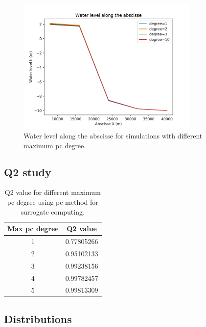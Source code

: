 \documentclass[hidelinks,12pt]{article}
\begin{document}
\begin{figure}
  \centering
  \includegraphics[width=0.8\textwidth]{images/influence_degree_method_surrogate_pc.png}
  \caption{Water level along the abscisse for simulations with different maximum pc degree.}
  	\label{influence_degree_method_surrogate_pc}
\end{figure}

\subsection{Q2 study}

\begin{table}
\begin{tabular}{|c|c|}
  \hline
  Max pc degree & Q2 value \\
  \hline
  1 & 0.77805266\\
  2 & 0.95102133\\
  3 & 0.99238156\\
  4 & 0.99782457\\
  5 & 0.99813309\\
  \hline
\end{tabular}
\caption{Q2 value for different maximum pc degree using pc method for surrogate computing.}
\label{influence_degree_method_surrogate_pc_Q2}
\end{table}

\subsection{Distributions}
\end{document}
